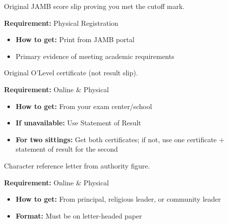 \documentclass[11pt,a4paper]{article}
\begin{document}
\begin{tcolorbox}[colback=lightGray,colframe=primary,title={\color{white}\textbf{�� UTME Result Slip}},colbacktitle=primary,arc=4pt,breakable]
Original JAMB score slip proving you met the cutoff mark.

\textbf{Requirement:} \textcolor{dangerRed}{Physical Registration}

\begin{itemize}[leftmargin=1em, itemsep=0.2em]
    \item \textbf{How to get:} Print from JAMB portal
    \item Primary evidence of meeting academic requirements
\end{itemize}
\end{tcolorbox}

\begin{tcolorbox}[colback=lightGray,colframe=primary,title={\color{white}\textbf{�� WAEC Certificate}},colbacktitle=primary,arc=4pt,breakable]
Original O'Level certificate (not result slip).

\textbf{Requirement:} \textcolor{successGreen}{Online \& Physical}

\begin{itemize}[leftmargin=1em, itemsep=0.2em]
    \item \textbf{How to get:} From your exam center/school
    \item \textbf{If unavailable:} Use Statement of Result
    \item \textbf{For two sittings:} Get both certificates; if not, use one certificate + statement of result for the second
\end{itemize}
\end{tcolorbox}

\begin{tcolorbox}[colback=lightGray,colframe=primary,title={\color{white}\textbf{✍️ Attestation Letter}},colbacktitle=primary,arc=4pt,breakable]
Character reference letter from authority figure.

\textbf{Requirement:} \textcolor{successGreen}{Online \& Physical}

\begin{itemize}[leftmargin=1em, itemsep=0.2em]
    \item \textbf{How to get:} From principal, religious leader, or community leader
    \item \textbf{Format:} Must be on letter-headed paper
\end{itemize}
\end{tcolorbox}
\end{document}
